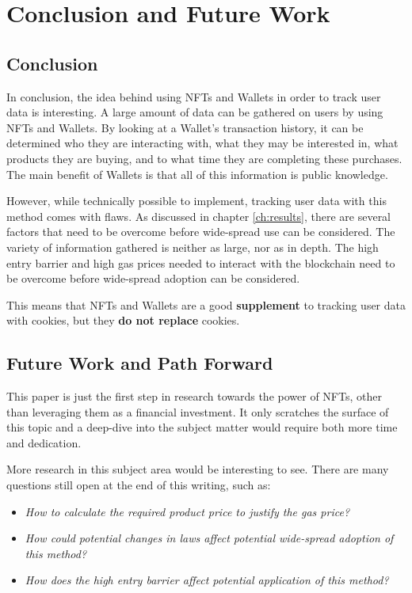 \chapter{Conclusion and Future Work}
\label{ch:conclusion}

%
%
\section{Conclusion}
\label{sec:conclusion:conclusion}
In conclusion, the idea behind using NFTs and Wallets in order to track user data is interesting. A large amount of data can be gathered on users by using NFTs and Wallets. By looking at a Wallet's transaction history, it can be determined who they are interacting with, what they may be interested in, what products they are buying, and to what time they are completing these purchases. The main benefit of Wallets is that all of this information is public knowledge.

However, while technically possible to implement, tracking user data with this method comes with flaws. As discussed in chapter \ref{ch:results}, there are several factors that need to be overcome before wide-spread use can be considered. The variety of information gathered is neither as large, nor as in depth. The high entry barrier and high gas prices needed to interact with the blockchain need to be overcome before wide-spread adoption can be considered.

This means that NFTs and Wallets are a good \textbf{supplement} to tracking user data with cookies, but they \textbf{do not replace} cookies.



%
%
\section{Future Work and Path Forward}
\label{sec:conclusion:futureWork}
This paper is just the first step in research towards the power of NFTs, other than leveraging them as a financial investment. It only scratches the surface of this topic and a deep-dive into the subject matter would require both more time and dedication.

More research in this subject area would be interesting to see. There are many questions still open at the end of this writing, such as:
\begin{itemize}
	\item \textit{How to calculate the required product price to justify the gas price?}
	\item \textit{How could potential changes in laws affect potential wide-spread adoption of this method?}
	\item \textit{How does the high entry barrier affect potential application of this method?}
\end{itemize}

